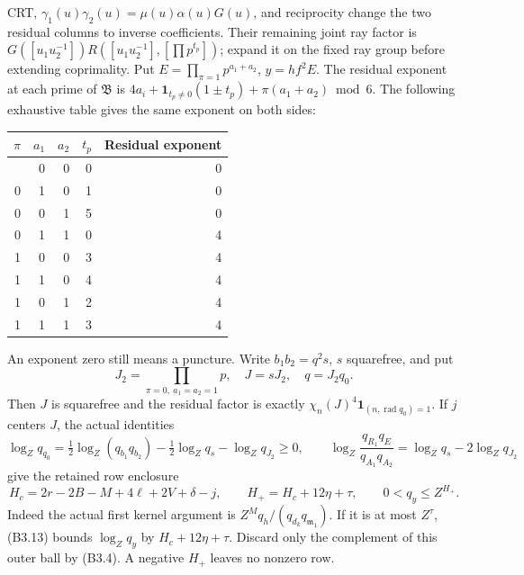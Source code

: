 \documentclass[11pt,a4paper]{article}
\begin{document}
CRT, \(\gamma_1(u)\gamma_2(u)=\mu(u)\alpha(u)G(u)\), and reciprocity
change the two residual columns to inverse coefficients. Their remaining
joint ray factor is
\(G([u_1u_2^{-1}])R([u_1u_2^{-1}],\allowbreak{}[\prod p^{t_p}])\); expand it on the
fixed ray group before extending coprimality. Put
\(E=\prod_{\pi=1}p^{a_1+a_2}\), \(y=hf^2E\). The residual exponent at
each prime of \(\mathfrak B\) is
\(4a_i+\mathbf1_{t_p\ne0}(1\pm t_p)+\pi(a_1+a_2)\bmod6\). The following
exhaustive table gives the same exponent on both sides:

\begin{longtable}[]{@{}rrrrr@{}}
\toprule\noalign{}
\(\pi\) & \(a_1\) & \(a_2\) & \(t_p\) & Residual exponent \\
\midrule\noalign{}
\endhead
\bottomrule\noalign{}
\endlastfoot
0 & 0 & 0 & 0 & 0 \\
0 & 1 & 0 & 1 & 0 \\
0 & 0 & 1 & 5 & 0 \\
0 & 1 & 1 & 0 & 4 \\
1 & 0 & 0 & 3 & 4 \\
1 & 1 & 0 & 4 & 4 \\
1 & 0 & 1 & 2 & 4 \\
1 & 1 & 1 & 3 & 4 \\
\end{longtable}

An exponent zero still means a puncture. Write \(b_1b_2=q^2s\), \(s\)
squarefree, and put \[
J_2=\prod_{\pi=0,\ a_1=a_2=1}p,
\quad J=sJ_2,\quad q=J_2q_0.
\] Then \(J\) is squarefree and the residual factor is exactly
\(\chi_n(J)^4\mathbf1_{(n,\allowbreak{}\operatorname{rad}q_0)=1}\). If \(j\) centers
\(J\), the actual identities \[
\log_Zq_{q_0}=\tfrac12\log_Z(q_{b_1}q_{b_2})
 -\tfrac12\log_Zq_s-\log_Zq_{J_2}\ge0,
\qquad
\log_Z\frac{q_{R_1}q_E}{q_{A_1}q_{A_2}}
=\log_Zq_s-2\log_Zq_{J_2}
\tag{B3.13}
\] give the retained row enclosure \[
H_c=2r-2B-M+4\ell+2V+\delta-j,
\qquad H_+=H_c+12\eta+\tau,
\qquad 0<q_y\le Z^{H_+}.
\tag{B3.14}
\] Indeed the actual first kernel argument is
\(Z^Mq_h/(q_{d_k}q_{\mathfrak m_1})\). If it is at most \(Z^\tau\),
(B3.13) bounds \(\log_Zq_y\) by \(H_c+12\eta+\tau\). Discard only the
complement of this outer ball by (B3.4). A negative \(H_+\) leaves no
nonzero row.
\end{document}
